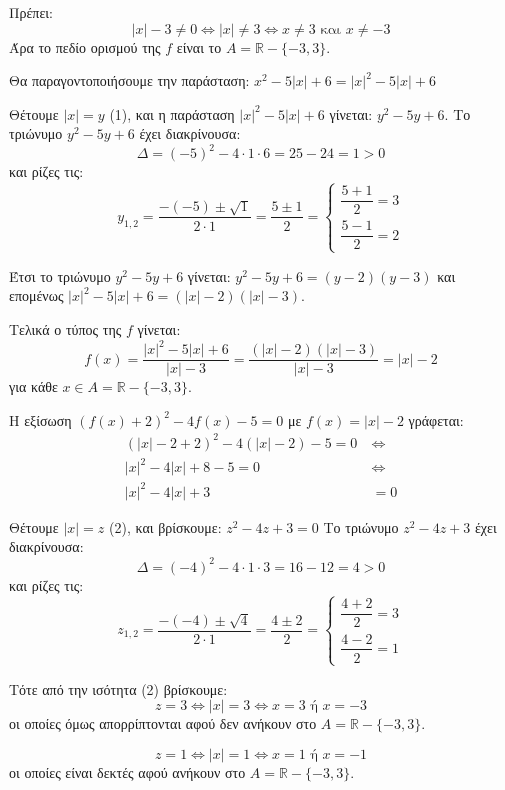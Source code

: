 
\begin{alist}
\item Πρέπει:
\[|x| - 3 \ne 0 \Leftrightarrow |x| \ne 3 \Leftrightarrow x \ne 3 \text{ και } x \ne -3\]
Άρα το πεδίο ορισμού της $f$ είναι το $A = \mathbb{R} - \{-3, 3\}$.

\item Θα παραγοντοποιήσουμε την παράσταση:
$x^2 - 5|x| + 6 = |x|^2 - 5|x| + 6$

Θέτουμε $|x| = y$ (1), και η παράσταση $|x|^2 - 5|x| + 6$ γίνεται: $y^2 - 5y + 6$.
Το τριώνυμο $y^2 - 5y + 6$ έχει διακρίνουσα:
\[\Delta = (-5)^2 - 4 \cdot 1 \cdot 6 = 25 - 24 = 1 > 0\]
και ρίζες τις:
\[y_{1,2} = \dfrac{-(-5) \pm \sqrt{1}}{2 \cdot 1} = \dfrac{5 \pm 1}{2} = \begin{cases} \dfrac{5 + 1}{2} = 3 \\ \dfrac{5 - 1}{2} = 2 \end{cases}\]

Έτσι το τριώνυμο $y^2 - 5y + 6$ γίνεται:
$y^2 - 5y + 6 = (y - 2)(y - 3)$
και επομένως
$|x|^2 - 5|x| + 6 = (|x| - 2)(|x| - 3)$.

Τελικά ο τύπος της $f$ γίνεται:
\[f(x) = \dfrac{|x|^2 - 5|x| + 6}{|x| - 3} = \dfrac{(|x| - 2)(|x| - 3)}{|x| - 3} = |x| - 2\]
για κάθε $x \in A = \mathbb{R} - \{-3, 3\}$.

\item Η εξίσωση $(f(x) + 2)^2 - 4f(x) - 5 = 0$ με $f(x) = |x| - 2$ γράφεται:
\begin{align*}
(|x| - 2 + 2)^2 - 4(|x| - 2) - 5 = 0 \ &\Leftrightarrow \\
|x|^2 - 4|x| + 8 - 5 = 0 \ &\Leftrightarrow \\
|x|^2 - 4|x| + 3 &= 0
\end{align*}

Θέτουμε $|x| = z$ (2), και βρίσκουμε:
$z^2 - 4z + 3 = 0$
Το τριώνυμο $z^2 - 4z + 3$ έχει διακρίνουσα:
\[\Delta = (-4)^2 - 4 \cdot 1 \cdot 3 = 16 - 12 = 4 > 0\]
και ρίζες τις:
\[z_{1,2} = \dfrac{-(-4) \pm \sqrt{4}}{2 \cdot 1} = \dfrac{4 \pm 2}{2} = \begin{cases} \dfrac{4 + 2}{2} = 3 \\ \dfrac{4 - 2}{2} = 1 \end{cases}\]

Τότε από την ισότητα (2) βρίσκουμε:
\[z = 3 \Leftrightarrow |x| = 3 \Leftrightarrow x = 3 \text{ ή } x = -3\]
οι οποίες όμως απορρίπτονται αφού δεν ανήκουν στο $A = \mathbb{R} - \{-3, 3\}$.

\[z = 1 \Leftrightarrow |x| = 1 \Leftrightarrow x = 1 \text{ ή } x = -1\]
οι οποίες είναι δεκτές αφού ανήκουν στο $A = \mathbb{R} - \{-3, 3\}$.
\end{alist}

